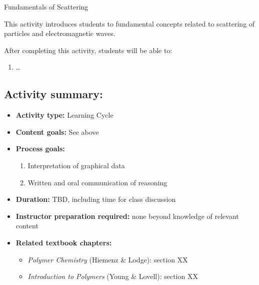 %
%
%
%

\renewcommand{\figpath}{content/polymphys/scattering/scattering-fundamentals/figs}
\renewcommand{\labelbase}{scattering-fundamentals}

\begin{activity}{Fundamentals of Scattering}
\label{\labelbase}

\begin{instructornotes}
	This activity introduces students to fundamental concepts related to scattering of particles and electromagnetic waves.
	
	After completing this activity, students will be able to:
	\begin{enumerate}
		\item \dots
	\end{enumerate}
	
	\subsection*{Activity summary:}
	\begin{itemize}
		\item \textbf{Activity type:} Learning Cycle
		\item \textbf{Content goals:} See above %
		\item \textbf{Process goals:} %
			\begin{enumerate}
				\item Interpretation of graphical data
				\item Written and oral communication of reasoning
			\end{enumerate}
		\item \textbf{Duration:} TBD, including time for class discussion
		\item \textbf{Instructor preparation required:} none beyond knowledge of relevant content
		\item \textbf{Related textbook chapters:}
			\begin{itemize}
				\item \emph{Polymer Chemistry} (Hiemenz \& Lodge): section XX
				\item \emph{Introduction to Polymers} (Young \& Lovell): section XX
			\end{itemize}
	\end{itemize}
	

\end{instructornotes}
\end{activity}
